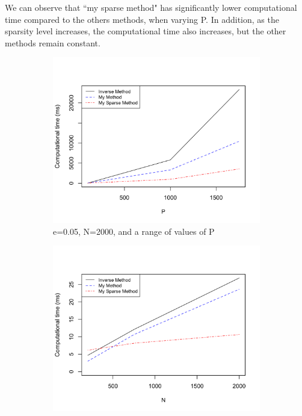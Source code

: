 \documentclass[11 pt]{article}
\begin{document}
\begin{enumerate}[label=(\Alph*)]
We can observe that ``my sparse method" has significantly lower computational time compared to the others methods, when varying P. In addition, as the sparsity level increases, the computational time also increases, but the other methods remain constant. 
\newpage

\begin{figure}[H]
	\begin{center}
		\begin{subfigure}[h]{0.45\linewidth}
			\includegraphics[width=\linewidth]{Ex01R/Fig/P1DPe005.png}
			\caption{e=0.05, N=2000, and a range of values of P}
		\end{subfigure}
		\begin{subfigure}[h]{0.45\linewidth}
			\includegraphics[width=\linewidth]{Ex01R/Fig/P1DNe005.png}

\end{subfigure}
\end{center}
\end{figure}
\end{enumerate}
\end{document}
